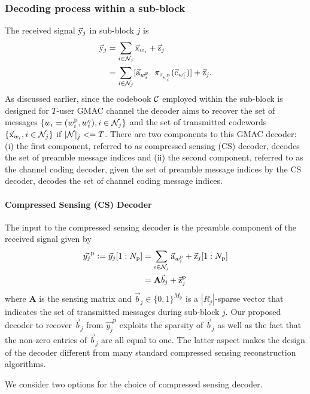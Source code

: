 \subsubsection{Decoding process within a sub-block}
The received signal $\vec{\mathrm{y}}_j$ in sub-block $j$ is
\begin{align*}
\vec{\mathrm{y}}_j&=\sum_{i\in\mathcal{N}_j}\vec{\mathrm{x}}_{w_i}+\vec{\mathrm{z}}_j ~~\qquad \\
&=\sum_{i\in\mathcal{N}_j} [\vec{\mathrm{a}}_{w^\mathrm{p}_i} ~~\pi_{\tau_{w^\mathrm{p}_i}}(\vec{\mathrm{c}}_{w^\mathrm{c}_i})] +\vec{\mathrm{z}}_j.
\end{align*} 
As discussed earlier, since the codebook $\mathcal{C}$ employed within the sub-block is designed for $T$-user GMAC channel the decoder aims to recover the set of messages $\{w_i=(w^\mathrm{p}_i,w^\mathrm{c}_i),i\in\mathcal{N}_j\}$ and the set of transmitted codewords $\{\vec{\mathrm{x}}_{w_i},i\in\mathcal{N}_j\}$ if $|\mathcal{N}|_j<=T$. There are two components to this GMAC decoder: (i) the first component, referred to as compressed sensing (CS) decoder, decodes the set of preamble message indices and (ii) the second component, referred to as the channel coding decoder, given the set of preamble message indices by the CS decoder, decodes the set of channel coding message indices.

\paragraph*{Compressed Sensing (CS) Decoder}
\label{sec:CS_decoder}
The input to the compressed sensing decoder is the preamble component of the received signal given by
\begin{align*}
\vec{y_{j}}^{\mathrm{p}}\mathrel{\mathop:}= \vec{y}_{j}[1:N_{\mathrm{p}}]&=\sum_{i\in\mathcal{N}_j} \vec{\mathrm{a}}_{w^{\mathrm{p}}_i}+\vec{\mathrm{z}}_{j}[1:N_{\mathrm{p}}]\\
&= \mathbf{A}\vec{b}_j+\vec{\mathrm{z}}_{j}^{\mathrm{p}}
\label{eq:cross_correlation}
\end{align*}
where $\mathbf{A}$ is the sensing matrix and $\vec{b}_j \in \{0,1\}^{M_\mathrm{p}}$ is a $|R_j|$-sparse vector that indicates the set of transmitted messages during sub-block $j$. Our proposed decoder to recover $\vec{b}_j$ from $\vec{y_{j}}^{\mathrm{p}}$ exploits the sparsity of $\vec{b}_j$ as well as the fact that the non-zero entries of $\vec{b}_j$ are all equal to one. The latter aspect makes the design of the decoder different from many standard compressed sensing reconstruction algorithms.

We consider two options for the choice of compressed sensing decoder. 

